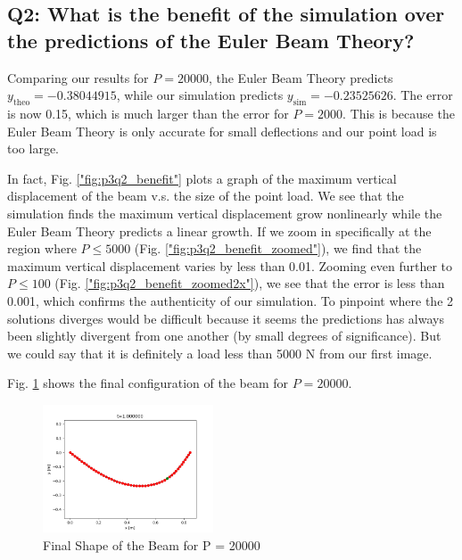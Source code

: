 \documentclass[letterpaper, 10 pt, conference]{ieeeconf}  %
\begin{document}
\subsection{Q2: What is the benefit of the simulation over the predictions of the Euler Beam Theory?}

Comparing our results for $P = 20000$, the Euler Beam Theory predicts $y_{\text{theo}} = -0.38044915$, while our simulation predicts $y_{\text{sim}} = -0.23525626$. The error is now 0.15, which is much larger than the error for $P = 2000$. This is because the Euler Beam Theory is only accurate for small deflections and our point load is too large.

In fact, Fig. \ref{"fig:p3q2_benefit"} plots a graph of the maximum vertical displacement of the beam v.s. the size of the point load. We see that the simulation finds the maximum vertical displacement grow nonlinearly while the Euler Beam Theory predicts a linear growth. If we zoom in specifically at the region where $P \leq 5000$ (Fig. \ref{"fig:p3q2_benefit_zoomed"}), we find that the maximum vertical displacement varies by less than 0.01. Zooming even further to $P \leq 100$ (Fig. \ref{"fig:p3q2_benefit_zoomed2x"}), we see that the error is less than 0.001, which confirms the authenticity of our simulation. To pinpoint where the 2 solutions diverges would be difficult because it seems the predictions has always been slightly divergent from one another (by small degrees of significance). But we could say that it is definitely a load less than 5000 N from our first image. 

Fig. \ref{"fig:p3q1_beam20000"} shows the final configuration of the beam for $P = 20000$.

\begin{figure}[!ht]
        \centering
        \includegraphics[width=0.45\textwidth,keepaspectratio]{p3q2_implicit_20000.png}
        \caption{Final Shape of the Beam for P = 20000}
        \label{"fig:p3q1_beam20000"}
\end{figure}
\end{document}
